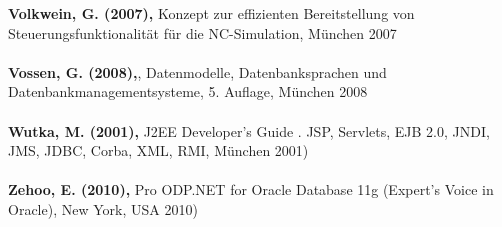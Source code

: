 \textbf{Volkwein, G. (2007),} Konzept zur effizienten Bereitstellung von Steuerungsfunktionalität für die NC-Simulation, München 2007\\\\
\textbf{Vossen, G. (2008),}, Datenmodelle, Datenbanksprachen und Datenbankmanagementsysteme, 5. Auflage, München 2008\\\\
\textbf{Wutka, M. (2001),} J2EE Developer's Guide . JSP, Servlets, EJB 2.0, JNDI, JMS, JDBC, Corba, XML, RMI, München 2001)\\\\
\textbf{Zehoo, E. (2010),} Pro ODP.NET for Oracle Database 11g (Expert's Voice in Oracle), New York, USA 2010)\\\\



